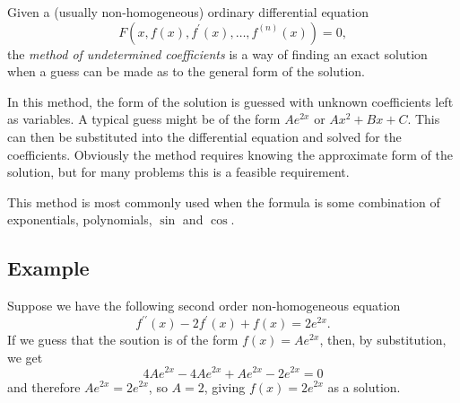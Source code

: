 \documentclass[12pt]{article}
\begin{document}
Given a (usually non-homogeneous) ordinary differential equation $$F(x,f(x),f^\prime(x),\ldots,f^{(n)}(x))=0,$$ the \emph{method of undetermined coefficients} is a way of finding an exact solution when a guess can be made as to the general form of the solution.

In this method, the form of the solution is guessed with unknown coefficients left as variables.  A typical guess might be of the form $Ae^{2x}$ or $Ax^2+Bx+C$.  This can then be substituted into the differential equation and solved for the coefficients.  Obviously the method requires knowing the approximate form of the solution, but for many problems this is a feasible requirement.

This method is most commonly used when the formula is some combination of exponentials, polynomials, $\sin$ and $\cos$.

\subsection*{Example}

Suppose we have the following second order non-homogeneous equation $$f^{\prime\prime}(x)-2f^\prime(x)+f(x)=2e^{2x}.$$  If we guess that the soution is of the form $f(x)=Ae^{2x}$, then, by substitution, we get $$4Ae^{2x}-4Ae^{2x}+Ae^{2x}-2e^{2x}=0$$ and therefore $Ae^{2x}=2e^{2x}$, so $A=2$, giving $f(x)=2e^{2x}$ as a solution.
\end{document}
